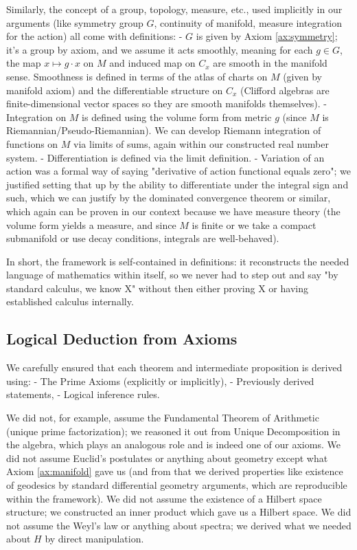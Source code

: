 \documentclass[11pt]{article}
\begin{document}
Similarly, the concept of a group, topology, measure, etc., used implicitly in our arguments (like symmetry group $G$, continuity of manifold, measure integration for the action) all come with definitions:
- $G$ is given by Axiom \ref{ax:symmetry}; it's a group by axiom, and we assume it acts smoothly, meaning for each $g\in G$, the map $x\mapsto g\cdot x$ on $M$ and induced map on $C_x$ are smooth in the manifold sense. Smoothness is defined in terms of the atlas of charts on $M$ (given by manifold axiom) and the differentiable structure on $C_x$ (Clifford algebras are finite-dimensional vector spaces so they are smooth manifolds themselves).
- Integration on $M$ is defined using the volume form from metric $g$ (since $M$ is Riemannian/Pseudo-Riemannian). We can develop Riemann integration of functions on $M$ via limits of sums, again within our constructed real number system. 
- Differentiation is defined via the limit definition. 
- Variation of an action was a formal way of saying "derivative of action functional equals zero"; we justified setting that up by the ability to differentiate under the integral sign and such, which we can justify by the dominated convergence theorem or similar, which again can be proven in our context because we have measure theory (the volume form yields a measure, and since $M$ is finite or we take a compact submanifold or use decay conditions, integrals are well-behaved).

In short, the framework is self-contained in definitions: it reconstructs the needed language of mathematics within itself, so we never had to step out and say "by standard calculus, we know X" without then either proving X or having established calculus internally.

\subsection*{Logical Deduction from Axioms}

We carefully ensured that each theorem and intermediate proposition is derived using:
- The Prime Axioms (explicitly or implicitly),
- Previously derived statements,
- Logical inference rules.

We did not, for example, assume the Fundamental Theorem of Arithmetic (unique prime factorization); we reasoned it out from Unique Decomposition in the algebra, which plays an analogous role and is indeed one of our axioms. We did not assume Euclid's postulates or anything about geometry except what Axiom \ref{ax:manifold} gave us (and from that we derived properties like existence of geodesics by standard differential geometry arguments, which are reproducible within the framework). We did not assume the existence of a Hilbert space structure; we constructed an inner product which gave us a Hilbert space. We did not assume the Weyl's law or anything about spectra; we derived what we needed about $H$ by direct manipulation. 
\end{document}
